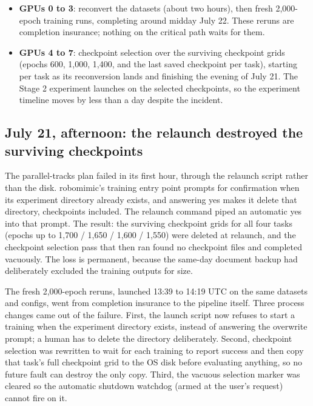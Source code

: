 \documentclass[11pt]{article}
\begin{document}
\begin{itemize}[leftmargin=2em]
  \item \textbf{GPUs 0 to 3}: reconvert the datasets (about two hours), then
        fresh 2,000-epoch training runs, completing around midday July 22.
        These reruns are completion insurance; nothing on the critical path
        waits for them.
  \item \textbf{GPUs 4 to 7}: checkpoint selection over the surviving
        checkpoint grids (epochs 600, 1,000, 1,400, and the last saved
        checkpoint per task), starting per task as its reconversion lands and
        finishing the evening of July 21. The Stage 2 experiment launches on
        the selected checkpoints, so the experiment timeline moves by less
        than a day despite the incident.
\end{itemize}

\subsection{July 21, afternoon: the relaunch destroyed the surviving
checkpoints}
\label{sec:incident2}

The parallel-tracks plan failed in its first hour, through the relaunch
script rather than the disk. robomimic's training entry point prompts for
confirmation when its experiment directory already exists, and answering yes
makes it delete that directory, checkpoints included. The relaunch command
piped an automatic yes into that prompt. The result: the surviving checkpoint
grids for all four tasks (epochs up to 1,700 / 1,650 / 1,600 / 1,550) were
deleted at relaunch, and the checkpoint selection pass that then ran found no
checkpoint files and completed vacuously. The loss is permanent, because the
same-day document backup had deliberately excluded the training outputs for
size.

The fresh 2,000-epoch reruns, launched 13:39 to 14:19 UTC on the same
datasets and configs, went from completion insurance to the pipeline itself.
Three process changes came out of the failure. First, the launch script now
refuses to start a training when the experiment directory exists, instead of
answering the overwrite prompt; a human has to delete the directory
deliberately. Second, checkpoint selection was rewritten to wait for each
training to report success and then copy that task's full checkpoint grid to
the OS disk before evaluating anything, so no future fault can destroy the
only copy. Third, the vacuous selection marker was cleared so the automatic
shutdown watchdog (armed at the user's request) cannot fire on it.
\end{document}
